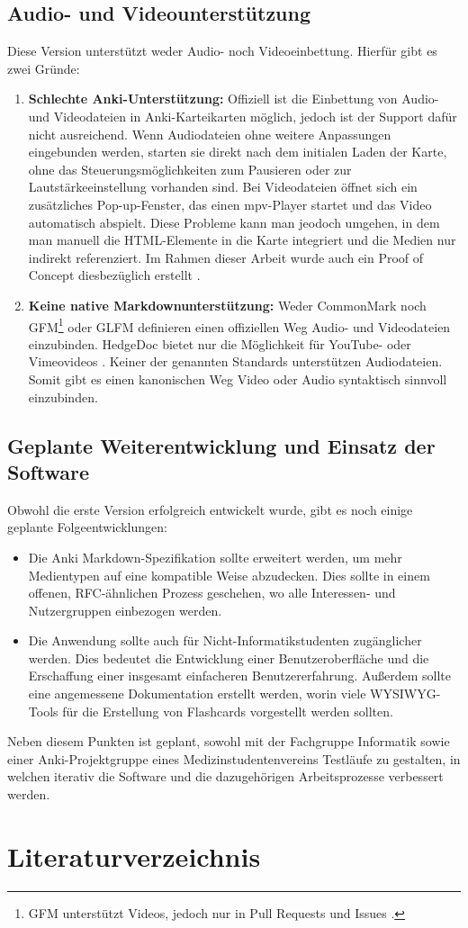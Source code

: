 \documentclass[ngerman]{article}
\begin{document}
\subsection{Audio- und Videounterst\"utzung}
Diese Version unterstützt weder Audio- noch Videoeinbettung. Hierfür gibt es zwei Gründe:
\begin{enumerate}
  \item \textbf{Schlechte Anki-Unterstützung:} Offiziell ist die Einbettung von Audio- und Videodateien in Anki-Karteikarten möglich, jedoch ist der Support dafür nicht ausreichend. Wenn Audiodateien ohne weitere Anpassungen eingebunden werden, starten sie direkt nach dem initialen Laden der Karte, ohne das Steuerungsmöglichkeiten zum Pausieren oder zur Lautstärkeeinstellung vorhanden sind. Bei Videodateien öffnet sich ein zusätzliches Pop-up-Fenster, das einen mpv-Player startet und das Video automatisch abspielt. Diese Probleme kann man jeodoch umgehen, in dem man manuell die HTML-Elemente in die Karte integriert und die Medien nur indirekt referenziert. Im Rahmen dieser Arbeit wurde auch ein Proof of Concept diesbezüglich erstellt \cite{AnkiPoC}.
  \item \textbf{Keine native Markdownunterstützung:} Weder CommonMark noch GFM\footnote{GFM unterstützt Videos, jedoch nur in Pull Requests und Issues \cite{GFMVid}.} oder GLFM definieren einen offiziellen Weg Audio- und Videodateien einzubinden. HedgeDoc bietet nur die Möglichkeit für YouTube- oder Vimeovideos \cite{HFM2}. Keiner der genannten Standards unterstützen Audiodateien. Somit gibt es einen kanonischen Weg Video oder Audio syntaktisch sinnvoll einzubinden.
\end{enumerate}
\subsection{Geplante Weiterentwicklung und Einsatz der Software}
Obwohl die erste Version erfolgreich entwickelt wurde, gibt es noch einige geplante Folgeentwicklungen:

\begin{itemize}
  \item Die Anki Markdown-Spezifikation sollte erweitert werden, um mehr Medientypen auf eine kompatible Weise abzudecken. Dies sollte in einem offenen, RFC-ähnlichen Prozess geschehen, wo alle Interessen- und Nutzergruppen einbezogen werden.
  \item Die Anwendung sollte auch für Nicht-Informatikstudenten zugänglicher werden. Dies bedeutet die Entwicklung einer Benutzeroberfläche und die Erschaffung einer insgesamt einfacheren Benutzererfahrung. Außerdem sollte eine angemessene Dokumentation erstellt werden, worin viele WYSIWYG-Tools für die Erstellung von Flashcards vorgestellt werden sollten.
\end{itemize}

Neben diesem Punkten ist geplant, sowohl mit der Fachgruppe Informatik sowie einer Anki-Projektgruppe eines Medizinstudentenvereins Testläufe zu gestalten, in welchen iterativ die Software und die dazugehörigen Arbeitsprozesse verbessert werden.
\newpage
\section{Literaturverzeichnis}
\printbibliography
\end{document}
